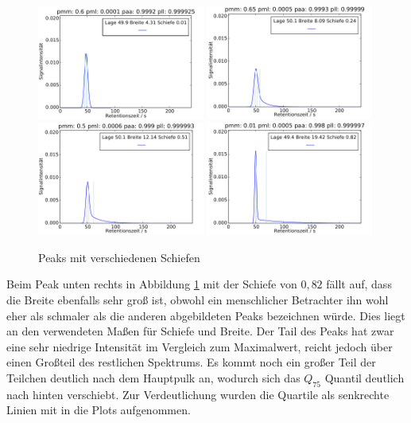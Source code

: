 \begin{figure}
 \includegraphics[width=0.49\textwidth]{bilder/Schiefe/001_q}
 \includegraphics[width=0.49\textwidth]{bilder/Schiefe/025_q}
 \includegraphics[width=0.49\textwidth]{bilder/Schiefe/05_q}
 \includegraphics[width=0.49\textwidth]{bilder/Schiefe/08_q}
\caption{Peaks mit verschiedenen Schiefen}
\label{diverse_schiefen}
\end{figure}

Beim Peak unten rechts in Abbildung \ref{diverse_schiefen} mit der Schiefe von $0,82$ fällt auf, dass die Breite ebenfalls sehr groß ist, obwohl ein menschlicher Betrachter ihn wohl eher als schmaler als die anderen abgebildeten Peaks bezeichnen würde. Dies liegt an den verwendeten Maßen für Schiefe und Breite. Der Tail des Peaks hat zwar eine sehr niedrige Intensität im Vergleich zum Maximalwert, reicht jedoch über einen Großteil des restlichen Spektrums. Es kommt noch ein großer Teil der Teilchen deutlich nach dem Hauptpulk an, wodurch sich das $Q_{75}$ Quantil deutlich nach hinten verschiebt. Zur Verdeutlichung wurden die Quartile als senkrechte Linien mit in die Plots aufgenommen.


